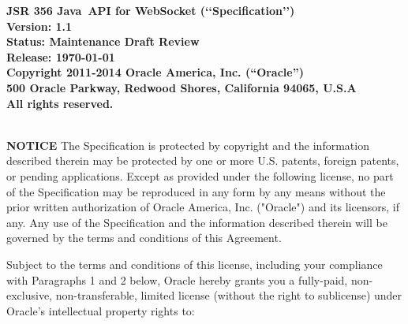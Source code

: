 \begin{flushleft}

{\bfseries JSR 356 Java\texttrademark\ API for WebSocket (\lq\lq Specification\rq\rq)\\
Version: 1.1 \\
Status:  Maintenance Draft Review \\
Release: \today\\
Copyright 2011-2014 Oracle America, Inc. (``Oracle'') \\
500 Oracle Parkway, Redwood Shores, California 94065, U.S.A\\
All rights reserved.
}

\mbox{}\\

{\bfseries NOTICE}
The Specification is protected by copyright and the information described therein may be protected by one or more U.S. patents, foreign patents, or pending applications. Except as provided under the following license, no part of the Specification may be reproduced in any form by any means without the prior written authorization of Oracle America, Inc. ("Oracle") and its licensors, if any. Any use of the Specification and the information described therein will be governed by the terms and conditions of this Agreement. 

Subject to the terms and conditions of this license, including your compliance with Paragraphs 1 and 2 below, Oracle hereby grants you a fully-paid, non-exclusive, non-transferable, limited license (without the right to sublicense) under Oracle's intellectual property rights to:


\end{flushleft}
